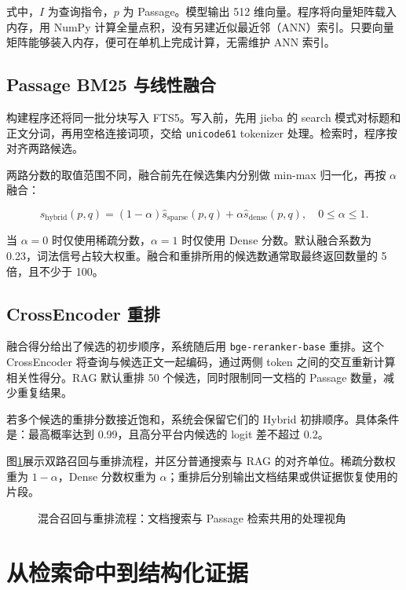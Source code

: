 \documentclass[UTF8,zihao=-4,fontset=fandol]{ctexart}
\newcommand{\passage}{Passage}
\newcommand{\code}[1]{\texttt{#1}}
\begin{document}
式中，$I$ 为查询指令，$p$ 为 \passage{}。模型输出 512 维向量。程序将向量矩阵载入内存，用 NumPy 计算全量点积，没有另建近似最近邻（ANN）索引。只要向量矩阵能够装入内存，便可在单机上完成计算，无需维护 ANN 索引。

\subsection{Passage BM25 与线性融合}

构建程序还将同一批分块写入 FTS5。写入前，先用 jieba 的 search 模式对标题和正文分词，再用空格连接词项，交给 \code{unicode61} tokenizer 处理。检索时，程序按  对齐两路候选。

两路分数的取值范围不同，融合前先在候选集内分别做 min-max 归一化，再按 $\alpha$ 融合：

\begin{equation}
s_{\mathrm{hybrid}}(p,q)=(1-\alpha)\hat{s}_{\mathrm{sparse}}(p,q)
+\alpha\hat{s}_{\mathrm{dense}}(p,q),\quad 0\leq\alpha\leq1.
\label{eq:hybrid}
\end{equation}

当 $\alpha=0$ 时仅使用稀疏分数，$\alpha=1$ 时仅使用 Dense 分数。默认融合系数为 0.23，词法信号占较大权重。融合和重排所用的候选数通常取最终返回数量的 5 倍，且不少于 100。

\subsection{CrossEncoder 重排}

融合得分给出了候选的初步顺序，系统随后用 \code{bge-reranker-base} 重排。这个 CrossEncoder 将查询与候选正文一起编码，通过两侧 token 之间的交互重新计算相关性得分。RAG 默认重排 50 个候选，同时限制同一文档的 \passage{} 数量，减少重复结果。

若多个候选的重排分数接近饱和，系统会保留它们的 Hybrid 初排顺序。具体条件是：最高概率达到 0.99，且高分平台内候选的 logit 差不超过 0.2。

图\ref{fig:search-flow}展示双路召回与重排流程，并区分普通搜索与 RAG 的对齐单位。稀疏分数权重为 $1-\alpha$，Dense 分数权重为 $\alpha$；重排后分别输出文档结果或供证据恢复使用的片段。

\begin{figure}[H]
\centering
\resizebox{\textwidth}{!}{}
\caption{混合召回与重排流程：文档搜索与 Passage 检索共用的处理视角}
\label{fig:search-flow}
\end{figure}

\section{从检索命中到结构化证据}
\end{document}
